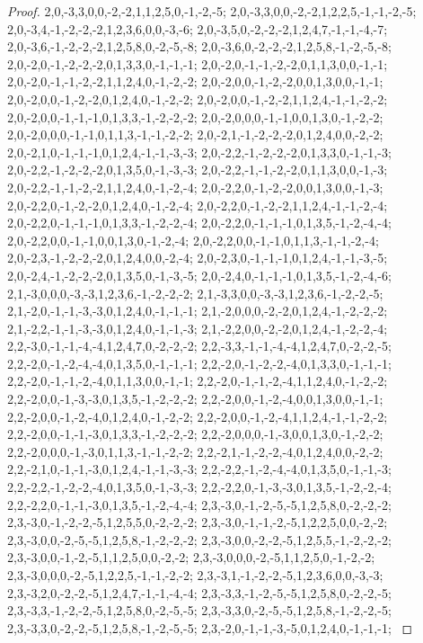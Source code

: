 \documentclass{article}
\begin{document}
\begin{proof}
{{2,0,-3,3,0,0,-2,-2,1,1,2,5,0,-1,-2,-5; 2,0,-3,3,0,0,-2,-2,1,2,2,5,-1,-1,-2,-5; 2,0,-3,4,-1,-2,-2,-2,1,2,3,6,0,0,-3,-6; 2,0,-3,5,0,-2,-2,-2,1,2,4,7,-1,-1,-4,-7; 2,0,-3,6,-1,-2,-2,-2,1,2,5,8,0,-2,-5,-8; 2,0,-3,6,0,-2,-2,-2,1,2,5,8,-1,-2,-5,-8; 2,0,-2,0,-1,-2,-2,-2,0,1,3,3,0,-1,-1,-1; 2,0,-2,0,-1,-1,-2,-2,0,1,1,3,0,0,-1,-1; 2,0,-2,0,-1,-1,-2,-2,1,1,2,4,0,-1,-2,-2; 2,0,-2,0,0,-1,-2,-2,0,0,1,3,0,0,-1,-1; 2,0,-2,0,0,-1,-2,-2,0,1,2,4,0,-1,-2,-2; 2,0,-2,0,0,-1,-2,-2,1,1,2,4,-1,-1,-2,-2;
2,0,-2,0,0,-1,-1,-1,0,1,3,3,-1,-2,-2,-2; 2,0,-2,0,0,0,-1,-1,0,0,1,3,0,-1,-2,-2; 2,0,-2,0,0,0,-1,-1,0,1,1,3,-1,-1,-2,-2; 2,0,-2,1,-1,-2,-2,-2,0,1,2,4,0,0,-2,-2; 2,0,-2,1,0,-1,-1,-1,0,1,2,4,-1,-1,-3,-3; 2,0,-2,2,-1,-2,-2,-2,0,1,3,3,0,-1,-1,-3; 2,0,-2,2,-1,-2,-2,-2,0,1,3,5,0,-1,-3,-3; 2,0,-2,2,-1,-1,-2,-2,0,1,1,3,0,0,-1,-3; 2,0,-2,2,-1,-1,-2,-2,1,1,2,4,0,-1,-2,-4; 2,0,-2,2,0,-1,-2,-2,0,0,1,3,0,0,-1,-3; 2,0,-2,2,0,-1,-2,-2,0,1,2,4,0,-1,-2,-4; 2,0,-2,2,0,-1,-2,-2,1,1,2,4,-1,-1,-2,-4;
2,0,-2,2,0,-1,-1,-1,0,1,3,3,-1,-2,-2,-4; 2,0,-2,2,0,-1,-1,-1,0,1,3,5,-1,-2,-4,-4; 2,0,-2,2,0,0,-1,-1,0,0,1,3,0,-1,-2,-4; 2,0,-2,2,0,0,-1,-1,0,1,1,3,-1,-1,-2,-4; 2,0,-2,3,-1,-2,-2,-2,0,1,2,4,0,0,-2,-4; 2,0,-2,3,0,-1,-1,-1,0,1,2,4,-1,-1,-3,-5; 2,0,-2,4,-1,-2,-2,-2,0,1,3,5,0,-1,-3,-5; 2,0,-2,4,0,-1,-1,-1,0,1,3,5,-1,-2,-4,-6; 2,1,-3,0,0,0,-3,-3,1,2,3,6,-1,-2,-2,-2; 2,1,-3,3,0,0,-3,-3,1,2,3,6,-1,-2,-2,-5; 2,1,-2,0,-1,-1,-3,-3,0,1,2,4,0,-1,-1,-1; 2,1,-2,0,0,0,-2,-2,0,1,2,4,-1,-2,-2,-2;
2,1,-2,2,-1,-1,-3,-3,0,1,2,4,0,-1,-1,-3; 2,1,-2,2,0,0,-2,-2,0,1,2,4,-1,-2,-2,-4; 2,2,-3,0,-1,-1,-4,-4,1,2,4,7,0,-2,-2,-2; 2,2,-3,3,-1,-1,-4,-4,1,2,4,7,0,-2,-2,-5; 2,2,-2,0,-1,-2,-4,-4,0,1,3,5,0,-1,-1,-1; 2,2,-2,0,-1,-2,-2,-4,0,1,3,3,0,-1,-1,-1; 2,2,-2,0,-1,-1,-2,-4,0,1,1,3,0,0,-1,-1; 2,2,-2,0,-1,-1,-2,-4,1,1,2,4,0,-1,-2,-2; 2,2,-2,0,0,-1,-3,-3,0,1,3,5,-1,-2,-2,-2; 2,2,-2,0,0,-1,-2,-4,0,0,1,3,0,0,-1,-1; 2,2,-2,0,0,-1,-2,-4,0,1,2,4,0,-1,-2,-2; 2,2,-2,0,0,-1,-2,-4,1,1,2,4,-1,-1,-2,-2;
2,2,-2,0,0,-1,-1,-3,0,1,3,3,-1,-2,-2,-2; 2,2,-2,0,0,0,-1,-3,0,0,1,3,0,-1,-2,-2; 2,2,-2,0,0,0,-1,-3,0,1,1,3,-1,-1,-2,-2; 2,2,-2,1,-1,-2,-2,-4,0,1,2,4,0,0,-2,-2; 2,2,-2,1,0,-1,-1,-3,0,1,2,4,-1,-1,-3,-3; 2,2,-2,2,-1,-2,-4,-4,0,1,3,5,0,-1,-1,-3; 2,2,-2,2,-1,-2,-2,-4,0,1,3,5,0,-1,-3,-3; 2,2,-2,2,0,-1,-3,-3,0,1,3,5,-1,-2,-2,-4; 2,2,-2,2,0,-1,-1,-3,0,1,3,5,-1,-2,-4,-4; 2,3,-3,0,-1,-2,-5,-5,1,2,5,8,0,-2,-2,-2; 2,3,-3,0,-1,-2,-2,-5,1,2,5,5,0,-2,-2,-2; 2,3,-3,0,-1,-1,-2,-5,1,2,2,5,0,0,-2,-2;
2,3,-3,0,0,-2,-5,-5,1,2,5,8,-1,-2,-2,-2; 2,3,-3,0,0,-2,-2,-5,1,2,5,5,-1,-2,-2,-2; 2,3,-3,0,0,-1,-2,-5,1,1,2,5,0,0,-2,-2; 2,3,-3,0,0,0,-2,-5,1,1,2,5,0,-1,-2,-2; 2,3,-3,0,0,0,-2,-5,1,2,2,5,-1,-1,-2,-2; 2,3,-3,1,-1,-2,-2,-5,1,2,3,6,0,0,-3,-3; 2,3,-3,2,0,-2,-2,-5,1,2,4,7,-1,-1,-4,-4; 2,3,-3,3,-1,-2,-5,-5,1,2,5,8,0,-2,-2,-5; 2,3,-3,3,-1,-2,-2,-5,1,2,5,8,0,-2,-5,-5; 2,3,-3,3,0,-2,-5,-5,1,2,5,8,-1,-2,-2,-5; 2,3,-3,3,0,-2,-2,-5,1,2,5,8,-1,-2,-5,-5; 2,3,-2,0,-1,-1,-3,-5,0,1,2,4,0,-1,-1,-1;
}}
\end{proof}
\end{document}
